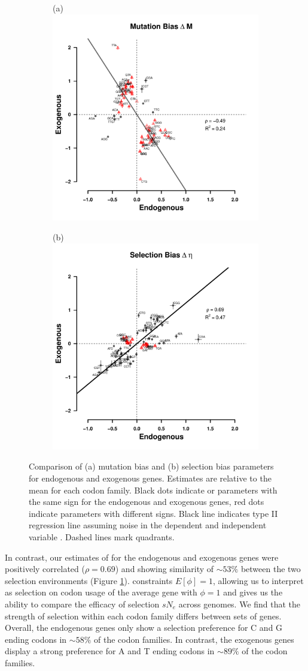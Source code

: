 \documentclass[fleqn,letterpaper]{article}
\begin{document}
\begin{figure}
    \centering
    \begin{subfigure}
        \centering
        (a) \includegraphics[width=.45\textwidth]{img/csp_corr_dm.pdf}
    \end{subfigure}
    \begin{subfigure}
        \centering
        (b) \includegraphics[width=.45\textwidth]{img/csp_corr_deta.pdf}
    \end{subfigure}
    \caption{Comparison of (a) mutation bias \DM and (b) selection bias \DE parameters for endogenous and exogenous genes.
      Estimates are relative to the mean for each codon family.
      Black dots indicate \DM or \DE parameters with the same sign for the endogenous and exogenous genes, red dots indicate parameters with different signs.
      Black line indicates type II regression line assuming noise in the dependent and independent variable \citep{SokalAndRohlf1981}.
      Dashed lines mark quadrants.}
    \label{fig:csp_comp}
\end{figure}

In contrast, our estimates of \DE for the endogenous and exogenous genes were positively correlated ($\rho = 0.69$) and showing similarity of $\sim53\%$ between the two selection environments (Figure \ref{fig:csp_comp}).
\ROC constraints $E[\phi] = 1$, allowing us to interpret \DE as selection on codon usage of the average gene with $\phi = 1$ and gives us the ability to compare the efficacy of selection $sN_e$  across genomes.
We find that the strength of selection within each codon family differs between sets of genes.
Overall, the endogenous genes only show a selection preference for C and G ending codons in $\sim58\%$ of the codon families.
In contrast, the exogenous genes display a strong preference for A and T ending codons in $\sim89\%$ of the codon families.
\end{document}
